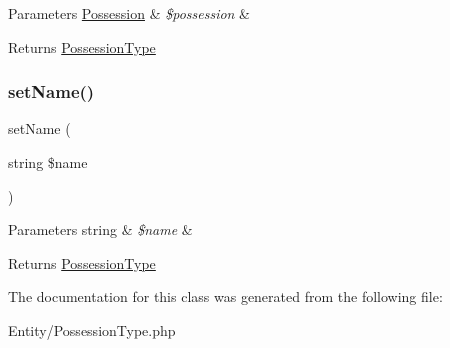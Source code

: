 \begin{DoxyParams}[1]{Parameters}
\mbox{\hyperlink{class_app_1_1_entity_1_1_possession}{Possession}} & {\em \$possession} & \\
\hline
\end{DoxyParams}
\begin{DoxyReturn}{Returns}
\mbox{\hyperlink{class_app_1_1_entity_1_1_possession_type}{Possession\+Type}} 
\end{DoxyReturn}
\mbox{\label{class_app_1_1_entity_1_1_possession_type_a392752b62c4f6aacea5c269690921ef3}} 
\subsubsection{\texorpdfstring{setName()}{setName()}}
{\footnotesize\ttfamily set\+Name (\begin{DoxyParamCaption}\item[{string}]{\$name }\end{DoxyParamCaption})}


\begin{DoxyParams}[1]{Parameters}
string & {\em \$name} & \\
\hline
\end{DoxyParams}
\begin{DoxyReturn}{Returns}
\mbox{\hyperlink{class_app_1_1_entity_1_1_possession_type}{Possession\+Type}} 
\end{DoxyReturn}


The documentation for this class was generated from the following file\+:\begin{DoxyCompactItemize}
\item 
Entity/Possession\+Type.\+php\end{DoxyCompactItemize}
